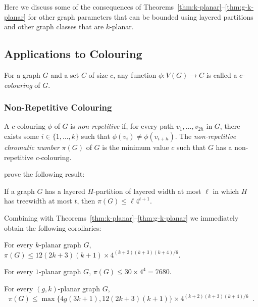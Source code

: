 \documentclass{patmorin}
\begin{document}
Here we discuss some of the consequences of Theorems~\ref{thm:k-planar}--\ref{thm:g-k-planar} for other graph parameters that can be bounded using layered partitions and other graph classes that are $k$-planar.

\subsection{Applications to Colouring}

For a graph $G$ and a set $C$ of size $c$, any function $\phi\colon V(G)\to C$  is called a \emph{$c$-colouring} of $G$.  

\subsubsection{Non-Repetitive Colouring}

A $c$-colouring $\phi$ of $G$ is \emph{non-repetitive} if, for every path $v_1,\ldots,v_{2h}$ in $G$, there exists some $i\in\{1,\ldots,k\}$ such that $\phi(v_i)\neq\phi(v_{i+h})$.  The \emph{non-repetitive chromatic number} $\pi(G)$ of $G$ is the minimum value $c$ such that $G$ has a non-repetitive $c$-colouring.

\citet[Corollaries~9 and 10]{dujmovic.esperet.ea:planar} prove the following result:

\begin{lem}
  If a graph $G$ has a layered $H$-partition of layered width at most $\ell$ in which $H$ has treewidth at most $t$, then $\pi(G)\le \ell 4^{t+1}$.
\end{lem}

Combining  with Theorems~\ref{thm:k-planar}--\ref{thm:g-k-planar} we immediately obtain the following corollaries:

\begin{cor}
  For every $k$-planar graph $G$, $\pi(G)\le 12(2k+3)(k+1)\times 4^{(k+2)(k+3)(k+4)/6}$.
\end{cor}

\begin{cor}
  For every $1$-planar graph $G$, $\pi(G)\le 30\times 4^4=7680$. 
\end{cor}

\begin{cor}
  For every $(g,k)$-planar graph $G$, 
  \[ 
    \pi(G)\le \max\{4g(3k+1),12(2k+3)(k+1)\}\times 4^{(k+2)(k+3)(k+4)/6} 
    \enspace .
  \]
\end{cor}
\end{document}
